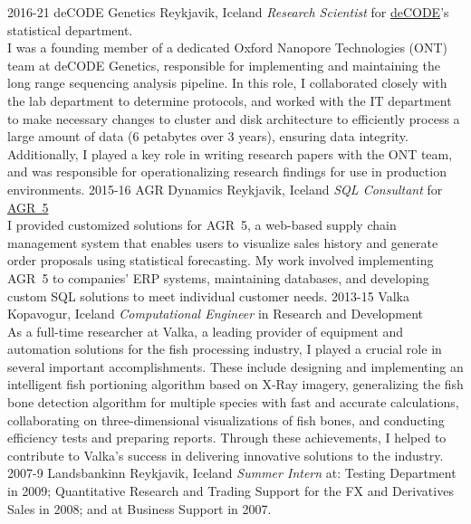 \begin{entrylist}
\entry
{2016-21}
{deCODE Genetics}
{Reykjavik, Iceland}
{\emph{Research Scientist} for \href{https://www.decode.com/}{deCODE}'s statistical department.\\
I was a founding member of a dedicated Oxford Nanopore Technologies (ONT) team at deCODE Genetics, responsible for implementing and maintaining the long range sequencing analysis pipeline. In this role, I collaborated closely with the lab department to determine protocols, and worked with the IT department to make necessary changes to cluster and disk architecture to efficiently process a large amount of data (6 petabytes over 3 years), ensuring data integrity. Additionally, I played a key role in writing research papers with the ONT team, and was responsible for operationalizing research findings for use in production environments.
}
\entry
{2015-16}
{AGR Dynamics}
{Reykjavik, Iceland}
{\emph{SQL Consultant} for \href{http://agrdynamics.com/}{AGR~5}\\
I provided customized solutions for AGR~5, a web-based supply chain management system that enables users to visualize sales history and generate order proposals using statistical forecasting. My work involved implementing AGR~5 to companies' ERP systems, maintaining databases, and developing custom SQL solutions to meet individual customer needs.
}    
\entry
{2013-15}
{Valka}
{Kopavogur, Iceland}
{\emph{Computational Engineer} in Research and Development \\
As a full-time researcher at Valka, a leading provider of equipment and automation solutions for the fish processing industry, I played a crucial role in several important accomplishments. These include designing and implementing an intelligent fish portioning algorithm based on X-Ray imagery, generalizing the fish bone detection algorithm for multiple species with fast and accurate calculations, collaborating on three-dimensional visualizations of fish bones, and conducting efficiency tests and preparing reports. Through these achievements, I helped to contribute to Valka's success in delivering innovative solutions to the industry.
}
\entry
{2007-9}
{Landsbankinn}
{Reykjavik, Iceland}
{\emph{Summer Intern} at: Testing Department in 2009; Quantitative Research and Trading Support for the FX and Derivatives Sales in 2008; and at Business Support in 2007.}
\end{entrylist}
